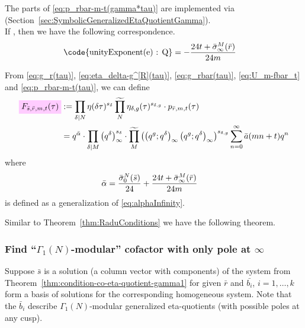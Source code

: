 \documentclass{article}
\begin{document}
The parts of \eqref{eq:p_rbar-m-t(gamma*tau)} are implemented via
\textcolor{blue}{}
(Section~\ref{sec:SymbolicGeneralizedEtaQuotientGamma}).
\\
If , then we have the
following correspondence.
\begin{align*}
  \text{\code{unityExponent(e) : Q}}
  &=
    -\frac{24t+\sigmainftybar[M]{\bar{r}}}{24m}
\end{align*}
















From \eqref{eq:g_r(tau)}, \eqref{eq:eta_delta-g^[R](tau)},
\eqref{eq:g_rbar(tau)}, \eqref{eq:U_m-fbar_t} and
\eqref{eq:p_rbar-m-t(tau)}, we can define
\begin{align}
  \defineNotation[F-sbar-rbar-m-t]{F_{\bar{s}, \bar{r}, m, t}(\tau)}
  &:= \divisorprod{N} \eta(\delta\tau)^{s_{\delta}}
    \genprod[N] \eta_{\delta,g}(\tau)^{s_{\delta,g}}
    \cdot p_{\bar{r},m,t}(\tau)
  \notag\\
  &=
    q^{\bar{\alpha}}
    \cdot
    \divisorprod{M}
    \eulerFunction{\delta}^{s_\delta}
    \cdot
    \genprod[M]
    \left(
    \qPochhammer{q^g}{q^\delta} \qPochhammer{q^g}{q^\delta}
    \right)^{s_{\delta,g}}
    \sum_{n=0}^\infty \bar{a}(mn+t) q^n
    \label{eq:F_sbar-rbar-m-t(tau)}
\end{align}
where
\begin{align}
  \bar{\alpha}
  &=
    \frac{\sigmazerobar[N]{\bar{s}}}{24}
    +
    \frac{24t+\sigmainftybar[M]{\bar{r}}}{24m}
    \label{eq:alphabarInfinity}
\end{align}
is defined as a generalization of \eqref{eq:alphaInfinity}.

Similar to Theorem~\ref{thm:RaduConditions} we have the following
theorem.


\subsubsection{Find ``$\Gamma_1(N)$-modular'' cofactor with only pole
  at $\infty$}

Suppose $\bar{s}$ is a solution (a column vector with 
components) of the system from
Theorem~\ref{thm:condition-co-eta-quotient-gamma1} for given $\bar{r}$
and $\bar{b_i}$, $i=1,\ldots,k$ form a basis of solutions for the
corresponding homogeneous system. Note that the $\bar{b}_i$ describe
$\Gamma_1(N)$-modular generalized eta-quotients (with possible poles
at any cusp).
\end{document}
